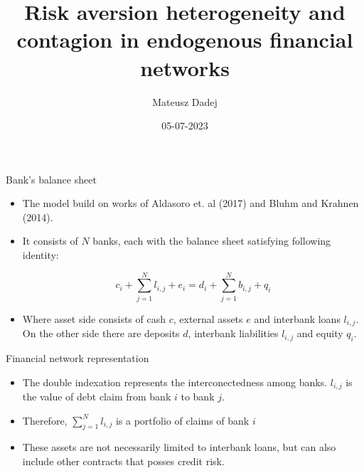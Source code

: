 \documentclass{beamer}
\title{Risk aversion heterogeneity and contagion in
endogenous financial networks}
\author{Mateusz Dadej}
\date{05-07-2023} %
\begin{document}
\begin{frame}
\titlepage
\end{frame}

\begin{frame}{Bank's balance sheet}

    \begin{itemize}
        \item The model build on works of Aldasoro et. al (2017) and Bluhm and Krahnen (2014). %
        \item It consists of $N$ banks, each with the balance sheet satisfying following identity:
        
        \[c_i + \sum_{j=1}^{N}l_{i,j} + e_i = d_i + \sum_{j=1}^{N}b_{i,j} + q_i\]

        \item Where asset side consists of cash $c$, external assets $e$ and interbank loans $l_{i,j}$. On the other side there are deposits $d$, interbank liabilities $l_{i,j}$ and equity $q_i$.
        
    \end{itemize}

\end{frame}

\begin{frame}{Financial network representation}

    \begin{itemize}
        \item The double indexation represents the interconectedness among banks. $l_{i,j}$ is the value of debt claim from bank $i$ to bank $j$.
        \item Therefore, $\sum_{j=1}^{N}l_{i,j}$ is a portfolio of claims of bank $i$
        \item These assets are not necessarily limited to interbank loans, but can also include other contracts that posses credit risk.
    \end{itemize}   

\end{frame}
\end{document}
